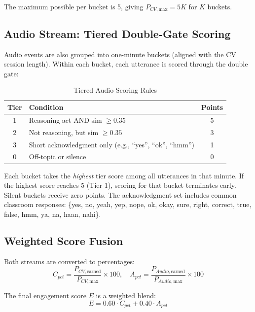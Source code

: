 \documentclass[conference]{IEEEtran}
\begin{document}
The maximum possible per bucket is 5, giving $P_{CV,\text{max}} = 5K$ for $K$ buckets.

\subsection{Audio Stream: Tiered Double-Gate Scoring}
Audio events are also grouped into one-minute buckets (aligned with the CV session length). Within each bucket, each utterance is scored through the double gate:

\begin{table}[htbp]
\caption{Tiered Audio Scoring Rules}
\begin{center}
\begin{tabular}{|c|p{3.8cm}|c|}
\hline
\textbf{Tier} & \textbf{Condition} & \textbf{Points} \\
\hline
1 & Reasoning act AND sim $\geq 0.35$ & 5 \\
\hline
2 & Not reasoning, but sim $\geq 0.35$ & 3 \\
\hline
3 & Short acknowledgment only (e.g., ``yes'', ``ok'', ``hmm'') & 1 \\
\hline
0 & Off-topic or silence & 0 \\
\hline
\end{tabular}
\label{tab:audio_tiers}
\end{center}
\end{table}

Each bucket takes the \emph{highest} tier score among all utterances in that minute. If the highest score reaches 5 (Tier 1), scoring for that bucket terminates early. Silent buckets receive zero points. The acknowledgment set includes common classroom responses: \{yes, no, yeah, yep, nope, ok, okay, sure, right, correct, true, false, hmm, ya, na, haan, nahi\}.

\subsection{Weighted Score Fusion}
Both streams are converted to percentages:
\begin{equation}
C_{pct} = \frac{P_{CV,\text{earned}}}{P_{CV,\text{max}}} \times 100, \quad
A_{pct} = \frac{P_{Audio,\text{earned}}}{P_{Audio,\text{max}}} \times 100
\label{eq:pct}
\end{equation}

The final engagement score $E$ is a weighted blend:
\begin{equation}
E = 0.60 \cdot C_{pct} + 0.40 \cdot A_{pct}
\label{eq:blend}
\end{equation}
\end{document}

